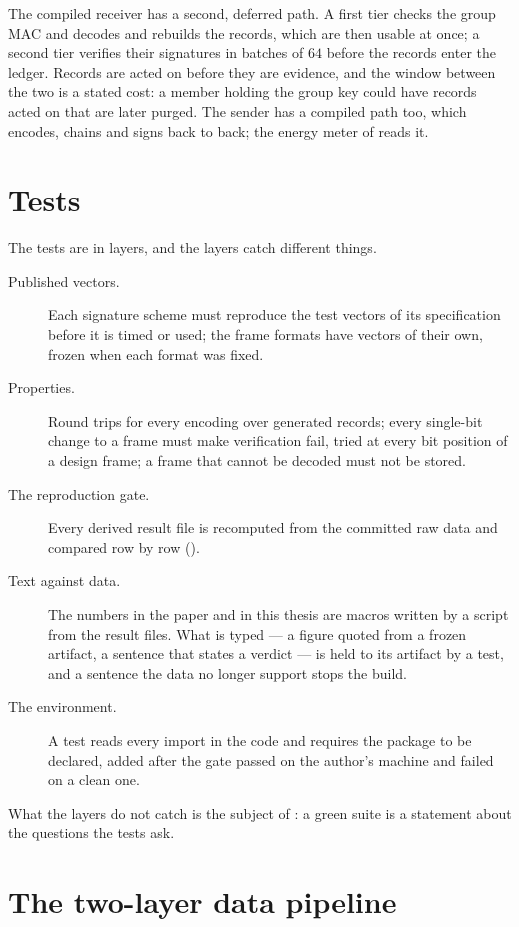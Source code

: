 The compiled receiver has a second, deferred path. A first tier checks the group MAC and decodes and
rebuilds the records, which are then usable at once; a second tier verifies their signatures in
batches of $64$ before the records enter the ledger. Records are acted on before they are
evidence, and the window between the two is a stated cost: a member holding the group key could
have records acted on that are later purged. The sender has a compiled path too, which encodes,
chains and signs back to back; the energy meter of  reads it.

\section{Tests}\label{sec:tests}

The tests are in layers, and the layers catch different things.

\begin{description}
\item[Published vectors.] Each signature scheme must reproduce the test vectors of its
specification before it is timed or used; the frame formats have vectors of their own, frozen
when each format was fixed.
\item[Properties.] Round trips for every encoding over generated records; every single-bit
change to a frame must make verification fail, tried at every bit position of a design frame;
a frame that cannot be decoded must not be stored.
\item[The reproduction gate.] Every derived result file is recomputed from the committed raw
data and compared row by row ().
\item[Text against data.] The numbers in the paper and in this thesis are macros written by a
script from the result files. What is typed --- a figure quoted from a frozen artifact, a
sentence that states a verdict --- is held to its artifact by a test, and a sentence the data no
longer support stops the build.
\item[The environment.] A test reads every import in the code and requires the package to be
declared, added after the gate passed on the author's machine and failed on a clean one.
\end{description}

\noindent What the layers do not catch is the subject of : a green
suite is a statement about the questions the tests ask.

\section{The two-layer data pipeline}\label{sec:pipeline}

